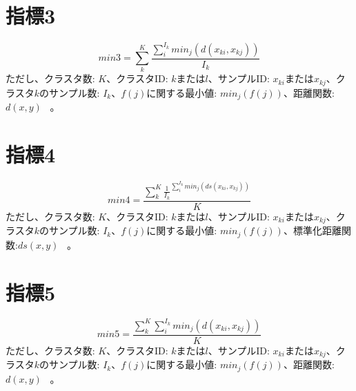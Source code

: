 \documentclass{article}
\begin{document}
\section{指標3}
\begin{equation}
min3={\sum_{k}^{K}{\frac{\sum_{i}^{I_k}{min_j(d(x_{ki},x_{kj}))}}{I_k}}}
\end{equation}
ただし、クラスタ数: $K$、クラスタID: $k$または$l$、サンプルID: $x_{ki}$または$x_{kj}$、クラスタ$k$のサンプル数: $I_k$、$f(j)$に関する最小値: $min_j(f(j))$、距離関数:$d(x,y)$  \ 。

\section{指標4}
\begin{equation}
min4={\frac{\sum_{k}^{K}{{\frac{1}{I_k}}^{\sum_{i}^{I_k}{min_j(ds(x_{ki},x_{kj}))}}}}{K}}
\end{equation}
ただし、クラスタ数: $K$、クラスタID: $k$または$l$、サンプルID: $x_{ki}$または$x_{kj}$、クラスタ$k$のサンプル数: $I_k$、$f(j)$に関する最小値: $min_j(f(j))$、標準化距離関数:$ds(x,y)$  \ 。

\section{指標5}
\begin{equation}
min5=\frac{ \sum_{k}^{K}{ \sum_{i}^{I_k}{min_j(d(x_{ki},x_{kj}))}  }  }{K}
\end{equation}
ただし、クラスタ数: $K$、クラスタID: $k$または$l$、サンプルID: $x_{ki}$または$x_{kj}$、クラスタ$k$のサンプル数: $I_k$、$f(j)$に関する最小値: $min_j(f(j))$、距離関数:$d(x,y)$  \ 。
\end{document}
